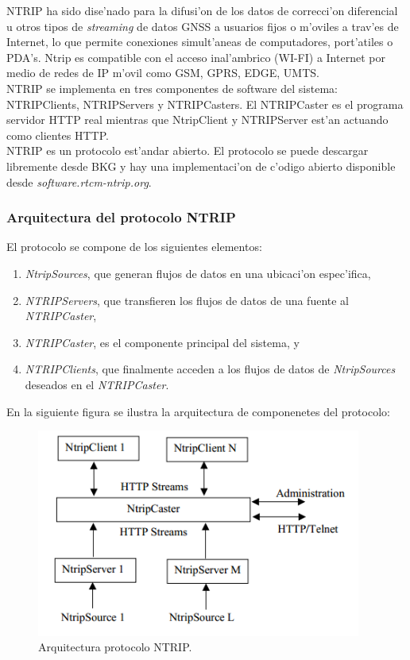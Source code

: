 NTRIP ha sido dise'nado para la difusi'on de los datos de correcci'on diferencial u otros tipos de \emph{streaming} de datos GNSS a usuarios fijos o m'oviles a trav'es de Internet, lo que permite conexiones simult'aneas de computadores, port'atiles o PDA's. Ntrip es compatible con el acceso inal'ambrico (WI-FI) a Internet por medio de redes de IP m'ovil como GSM, GPRS, EDGE, UMTS.\\

NTRIP se implementa en tres componentes de software del sistema: NTRIPClients, NTRIPServers y NTRIPCasters. El NTRIPCaster es el programa servidor HTTP real mientras que NtripClient y NTRIPServer est'an actuando como clientes HTTP.\\

NTRIP es un protocolo est'andar abierto. El protocolo se puede descargar libremente desde BKG y hay una implementaci'on de c'odigo abierto disponible desde \emph{software.rtcm-ntrip.org}.

\subsubsection{Arquitectura del protocolo NTRIP}
\noindent
El protocolo se compone de los siguientes elementos:
\begin{enumerate}
\item \emph{NtripSources}, que generan flujos de datos en una ubicaci'on espec'ifica, 
\item \emph{NTRIPServers}, que transfieren los flujos de datos de una fuente al \emph{NTRIPCaster},
\item \emph{NTRIPCaster}, es el componente principal del sistema, y 
\item \emph{NTRIPClients}, que finalmente acceden a los flujos de datos de \emph{NtripSources} deseados en el \emph{NTRIPCaster}.
\end{enumerate}

En la siguiente figura se ilustra la arquitectura de componenetes del protocolo:

\begin{figure}[H]
\centering
\includegraphics[width=0.95\textwidth]{images/Ntrip_Arquitectura}
\caption{Arquitectura protocolo NTRIP.}
\label{fig:4.1}
\end{figure}

